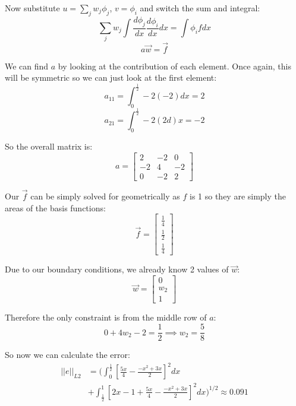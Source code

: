\documentclass{article}
\begin{document}
Now substitute $u=\sum_j w_j\phi_j$, $v=\phi_i$ and switch the sum and integral:
\begin{equation}
\sum_j w_j\int \frac{d\phi_j}{dx}\frac{d\phi_i}{dx}dx=\int\phi_ifdx
\end{equation}
\begin{equation}
a\vec w=\vec f
\end{equation}

We can find $a$ by looking at the contribution of each element. Once again, this will be symmetric so we can just look at the first element:
\begin{equation}
a_{11}=\int_0^{\frac{1}{2}} -2(-2)dx=2
\end{equation}
\begin{equation}
a_{21}=\int_0^{\frac{1}{2}} -2(2d)x=-2
\end{equation}

So the overall matrix is:
\begin{equation}
a=\begin{bmatrix}
2 & -2 & 0 \\
-2 & 4 & -2 \\
0 & -2 & 2
\end{bmatrix}
\end{equation}

Our $\vec f$ can be simply solved for geometrically as $f$ is 1 so they are simply the areas of the basis functions: 
\begin{equation}
\vec f =
\begin{bmatrix}
\frac{1}{4} \\[1ex] \frac{1}{2} \\[1ex] \frac{1}{4}
\end{bmatrix}
\end{equation}

Due to our boundary conditions, we already know 2 values of $\vec w$:
\begin{equation}
\vec w=
\begin{bmatrix}
0 \\ w_2 \\ 1
\end{bmatrix}
\end{equation}

Therefore the only constraint is from the middle row of $a$:
\begin{equation}
0+4w_2-2=\frac{1}{2} \implies w_2=\frac{5}{8}
\end{equation}

So now we can calculate the error:
\begin{align}
||e||_{L2}&=\Big(\int_0^{\frac{1}{2}}\left[\frac{5x}{4}-\frac{-x^2+3x}{2}\right]^2dx \nonumber \\
&+\int_{\frac{1}{2}}^1\left[ 2x-1+\frac{5x}{4}-\frac{-x^2+3x}{2}\right]^2dx\Big)^{1/2}\approx 0.091
\end{align}
\end{document}
